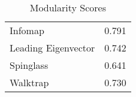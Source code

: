 \begin{table}[!h]

\caption{Modularity Scores}
\centering
\begin{tabular}[t]{lr}
\toprule
Infomap & 0.791\\
Leading Eigenvector & 0.742\\
Spinglass & 0.641\\
Walktrap & 0.730\\
\bottomrule
\end{tabular}
\end{table}
